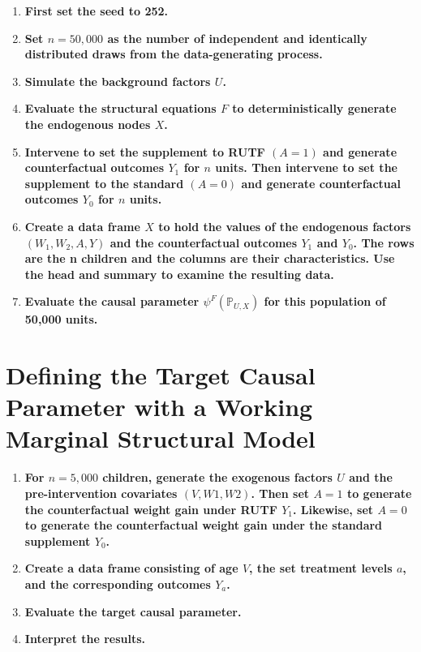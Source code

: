 \documentclass{article}\usepackage[]{graphicx}\usepackage[]{xcolor}
\begin{document}
    \begin{enumerate}[label=\textbf{\arabic*.}]
    
      \item \textbf{First set the seed to 252.}
      
      \item \textbf{Set $n = 50,000$ as the number of independent and identically distributed draws from the data-generating process.}
      
      \item \textbf{Simulate the background factors $U$.}
      
      \item \textbf{Evaluate the structural equations $F$ to deterministically generate the endogenous nodes $X$.}
      
      \item \textbf{Intervene to set the supplement to RUTF $(A = 1)$ and generate counterfactual outcomes $Y_1$ for $n$ units. Then intervene to set the supplement to the standard $(A = 0)$ and generate counterfactual outcomes $Y_0$ for $n$ units.}
      
      \item \textbf{Create a data frame $X$ to hold the values of the endogenous factors $(W_1, W_2, A, Y)$ and the counterfactual outcomes $Y_1$ and $Y_0$. The rows are the n children and the columns are their characteristics. Use the head and summary to examine the resulting data.}
      
      \item \textbf{Evaluate the causal parameter $\psi^F(\mathbb{P}_{U,X})$ for this population of 50,000 units.}
  
    \end{enumerate}

\pagebreak
  
\section{Defining the Target Causal Parameter with a Working Marginal Structural Model}

\begin{enumerate}[label=\textbf{\arabic*.}]

  \item \textbf{For $n = 5,000$ children, generate the exogenous factors $U$ and the pre-intervention covariates $(V, W1, W2)$. Then set $A = 1$ to generate the counterfactual weight gain under RUTF $Y_1$. Likewise, set $A = 0$ to generate the counterfactual weight gain under the standard supplement $Y_0$.}
  
  \item \textbf{Create a data frame}  \textbf{consisting of age $V$, the set treatment levels $a$, and the corresponding outcomes $Y_a$.}
  
  \item \textbf{Evaluate the target causal parameter.}
  
  \item \textbf{Interpret the results.}

\end{enumerate}
      
\end{document}
